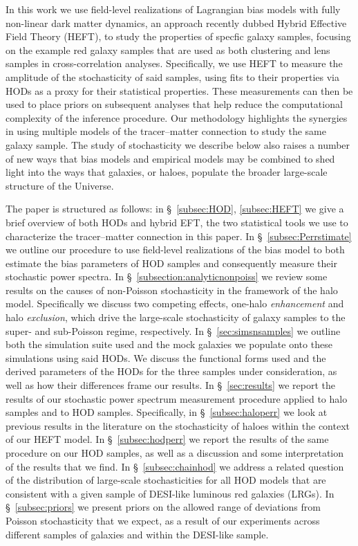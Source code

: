 \documentclass[fleqn,usenatbib]{mnras}
\begin{document}
In this work we use field-level realizations of Lagrangian bias models with fully non-linear dark matter dynamics, an approach recently dubbed Hybrid Effective Field Theory (HEFT), to study the properties of specfic galaxy samples, focusing on the example red galaxy samples that are used as both clustering and lens samples in cross-correlation analyses. Specifically, we use HEFT to measure the amplitude of the stochasticity of said samples, using fits to their properties via HODs as a proxy for their statistical properties. These measurements can then be used to place priors on subsequent analyses that help reduce the computational complexity of the inference procedure. Our methodology highlights the synergies in using multiple models of the tracer--matter connection to study the same galaxy sample. The study of stochasticity we describe below also raises a number of new ways that bias models and empirical models may be combined to shed light into the ways that galaxies, or haloes, populate the broader large-scale structure of the Universe. \par 
The paper is structured as follows: in \S~\ref{subsec:HOD}, \ref{subsec:HEFT} we give a brief overview of both HODs and hybrid EFT, the two statistical tools we use to characterize the tracer--matter connection in this paper. In \S~\ref{subsec:Perrstimate} we outline our procedure to use field-level realizations of the bias model to both estimate the bias parameters of HOD samples and consequently measure their stochastic power spectra. In \S~\ref{subsection:analyticnonpoiss} we review some results on the causes of non-Poisson stochasticity in the framework of the halo model. Specifically we discuss two competing effects, one-halo \emph{enhancement} and halo \emph{exclusion}, which drive the large-scale stochasticity of galaxy samples to the super- and sub-Poisson regime, respectively. In \S~\ref{sec:simsnsamples} we outline both the simulation suite used and the mock galaxies we populate onto these simulations using said HODs. We discuss the functional forms used and the derived parameters of the HODs for the three samples under consideration, as well as how their differences frame our results. In \S~\ref{sec:results} we report the results of our stochastic power spectrum measurement procedure applied to halo samples and to HOD samples. Specifically, in \S~\ref{subsec:haloperr} we look at previous results in the literature on the stochasticity of haloes within the context of our HEFT model. In \S~\ref{subsec:hodperr} we report the results of the same procedure on our HOD samples, as well as a discussion and some interpretation of the results that we find. In \S~\ref{subsec:chainhod} we address a related question of the distribution of large-scale stochasticities for all HOD models that are consistent with a given sample of DESI-like luminous red galaxies (LRGs). In \S~\ref{subsec:priors} we present priors on the allowed range of deviations from Poisson stochasticity that we expect, as a result of our experiments across different samples of galaxies and within the DESI-like sample.
\end{document}
